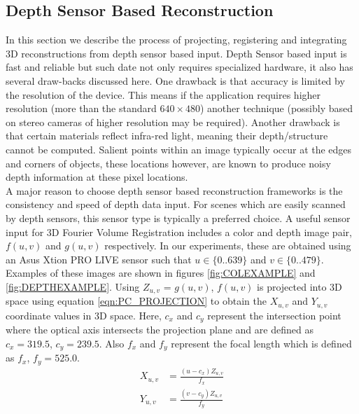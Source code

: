 
\subsection{Depth Sensor Based Reconstruction}

In this section we describe the process of projecting, registering and integrating 3D reconstructions from depth sensor based input. Depth Sensor based input is fast and reliable but such date not only requires specialized hardware, it also has several draw-backs discussed here. One drawback is that accuracy is limited by the resolution of the device. This means if the application requires higher resolution (more than the standard $640\times 480$) another technique (possibly based on stereo cameras of higher resolution may be required). Another drawback is that certain materials reflect infra-red light, meaning their depth/structure cannot be computed. Salient points within an image typically occur at the edges and corners of objects, these locations however, are known to produce noisy depth information at these pixel locations. \\

A major reason to choose depth sensor based reconstruction frameworks is the consistency and speed of depth data input. For scenes which are easily scanned by depth sensors, this sensor type is typically a preferred choice. A useful sensor input for 3D Fourier Volume Registration includes a color and depth image pair, $f(u,v)$ and $g(u,v)$ respectively. In our experiments, these are obtained using an Asus Xtion PRO LIVE sensor such that $u \in \{0..639\}$ and $v \in \{0..479\}$. Examples of these images are shown in figures \ref{fig:COLEXAMPLE} and \ref{fig:DEPTHEXAMPLE}. Using $Z_{u,v}$ = $g(u,v)$, $f(u,v)$ is projected into 3D space using equation \ref{eqn:PC_PROJECTION} to obtain the $X_{u,v}$ and $Y_{u,v}$ coordinate values in 3D space. Here, $c_x$ and $c_y$ represent the intersection point where the optical axis intersects the projection plane and are defined as $c_x = 319.5$, $c_y = 239.5$. Also $f_x$ and $f_y$ represent the focal length which is defined as $f_x$, $f_y = 525.0$. \\


\begin{equation} \label{eqn:PC_PROJECTION}
\begin{split}
X_{u,v} & = \frac{(u - c_x)Z_{u,v}}{f_x} \\
Y_{u,v} & = \frac{(v - c_y)Z_{u,v}}{f_y} \\
\end{split}
\end{equation}

